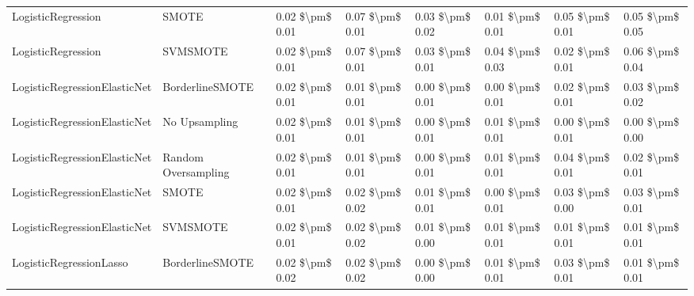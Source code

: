 \begin{tabular}{llllllll}
             LogisticRegression &                         SMOTE & 0.02 \$\textbackslash pm\$ 0.01 &           0.07 \$\textbackslash pm\$ 0.01 &       0.03 \$\textbackslash pm\$ 0.02 &        0.01 \$\textbackslash pm\$ 0.01 &                         0.05 \$\textbackslash pm\$ 0.01 &     0.05 \$\textbackslash pm\$ 0.05 \\
             LogisticRegression &                      SVMSMOTE & 0.02 \$\textbackslash pm\$ 0.01 &           0.07 \$\textbackslash pm\$ 0.01 &       0.03 \$\textbackslash pm\$ 0.01 &        0.04 \$\textbackslash pm\$ 0.03 &                         0.02 \$\textbackslash pm\$ 0.01 &     0.06 \$\textbackslash pm\$ 0.04 \\
   LogisticRegressionElasticNet &               BorderlineSMOTE & 0.02 \$\textbackslash pm\$ 0.01 &           0.01 \$\textbackslash pm\$ 0.01 &       0.00 \$\textbackslash pm\$ 0.01 &        0.00 \$\textbackslash pm\$ 0.01 &                         0.02 \$\textbackslash pm\$ 0.01 &     0.03 \$\textbackslash pm\$ 0.02 \\
   LogisticRegressionElasticNet &                 No Upsampling & 0.02 \$\textbackslash pm\$ 0.01 &           0.01 \$\textbackslash pm\$ 0.01 &       0.00 \$\textbackslash pm\$ 0.01 &        0.01 \$\textbackslash pm\$ 0.01 &                         0.00 \$\textbackslash pm\$ 0.01 &     0.00 \$\textbackslash pm\$ 0.00 \\
   LogisticRegressionElasticNet &           Random Oversampling & 0.02 \$\textbackslash pm\$ 0.01 &           0.01 \$\textbackslash pm\$ 0.01 &       0.00 \$\textbackslash pm\$ 0.01 &        0.01 \$\textbackslash pm\$ 0.01 &                         0.04 \$\textbackslash pm\$ 0.01 &     0.02 \$\textbackslash pm\$ 0.01 \\
   LogisticRegressionElasticNet &                         SMOTE & 0.02 \$\textbackslash pm\$ 0.01 &           0.02 \$\textbackslash pm\$ 0.02 &       0.01 \$\textbackslash pm\$ 0.01 &        0.00 \$\textbackslash pm\$ 0.01 &                         0.03 \$\textbackslash pm\$ 0.00 &     0.03 \$\textbackslash pm\$ 0.01 \\
   LogisticRegressionElasticNet &                      SVMSMOTE & 0.02 \$\textbackslash pm\$ 0.01 &           0.02 \$\textbackslash pm\$ 0.02 &       0.01 \$\textbackslash pm\$ 0.00 &        0.01 \$\textbackslash pm\$ 0.01 &                         0.01 \$\textbackslash pm\$ 0.01 &     0.01 \$\textbackslash pm\$ 0.01 \\
        LogisticRegressionLasso &               BorderlineSMOTE & 0.02 \$\textbackslash pm\$ 0.02 &           0.02 \$\textbackslash pm\$ 0.02 &       0.00 \$\textbackslash pm\$ 0.00 &        0.01 \$\textbackslash pm\$ 0.01 &                         0.03 \$\textbackslash pm\$ 0.01 &     0.01 \$\textbackslash pm\$ 0.01 \\

\end{tabular}
